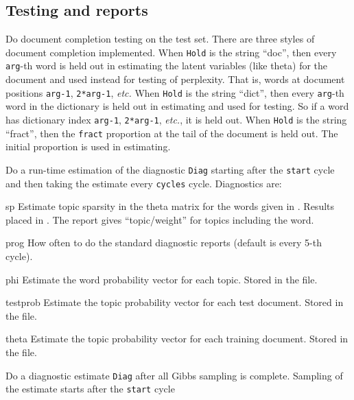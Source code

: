 \documentclass[a4paper,english]{article}
\begin{document}
\subsection{Testing and reports}
\begin{Description}\setlength{\itemsep}{0cm}
\item[\OptArg{-h}{Hold,arg}] 
Do document completion testing on the test set.
There are three styles of document completion implemented.
When \texttt{Hold} is the string ``doc'', then every \texttt{arg}-th
word is held out in estimating the latent variables (like theta)
for the document and used instead for testing of perplexity.
That is, words at document positions \texttt{arg-1}, \texttt{2*arg-1}, 
\emph{etc.}
When \texttt{Hold} is the string ``dict'', then every \texttt{arg}-th
word in the dictionary is held out in estimating
and used for testing.  So if a word has dictionary index 
\texttt{arg-1}, \texttt{2*arg-1}, \emph{etc.}, it is held out.
When \texttt{Hold} is the string ``fract'',
then the \texttt{fract}
proportion at the tail of the document is held out.  
The initial proportion is used in estimating.
\item[\OptArg{-l}{Diag,cycles,start}] 
Do a run-time estimation of the diagnostic \texttt{Diag}
starting after the \texttt{start} cycle and then taking the
estimate every \texttt{cycles} cycle.
Diagnostics are:
\begin{Description}[testprob]\setlength{\itemsep}{0cm}
\item[sp] 
Estimate topic sparsity in the theta matrix for the
words given in .
Results placed in .
The report gives ``topic/weight'' for topics including the word.
\item[prog] 
How often to do the standard diagnostic reports
(default is every 5-th cycle).
\item[phi] 
Estimate the word probability vector for each topic.
Stored in the  file.
\item[testprob] 
Estimate the topic probability vector for each test document.  
Stored in the  file.
\item[theta] 
Estimate the topic probability vector for each training document.
Stored in the  file.
\end{Description}
\item[\OptArg{-L}{Diag,cycles,start}] 
Do a diagnostic estimate \texttt{Diag} after
all Gibbs sampling is complete.
Sampling of the estimate starts after the \texttt{start} cycle 

\end{Description}
\end{document}
